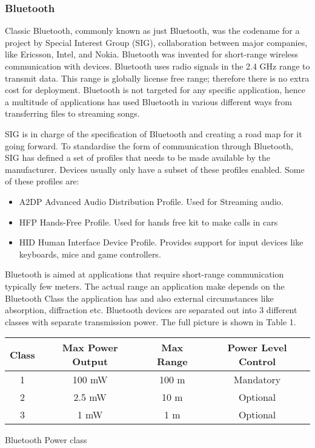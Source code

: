 \subsubsection{Bluetooth}

Classic Bluetooth, commonly known as just Bluetooth, was the codename for
a project by Special Interest Group (SIG), collaboration between major
companies, like Ericsson, Intel, and Nokia\cite{bluetooth-wiki}. Bluetooth was invented
for short-range wireless communication with devices. Bluetooth uses
radio signals in the 2.4 GHz range to transmit data. This range is
globally license free range; therefore there is no extra cost for
deployment. Bluetooth is not targeted for any specific application, hence
a multitude of applications has used Bluetooth in various different
ways from transferring files to streaming songs.

SIG is in charge of the specification of Bluetooth and creating a
road map for it going forward. To standardise the form of communication
through Bluetooth, SIG has defined a set of profiles that needs to
be made available by the manufacturer. Devices usually only have a
subset of these profiles enabled\cite{bluetooth-profiles}. Some of these profiles are: 
\begin{itemize}
\item A2DP Advanced Audio Distribution Profile. Used for Streaming audio. 
\item HFP Hands-Free Profile. Used for hands free kit to make calls in cars 
\item HID Human Interface Device Profile. Provides support for input devices
like keyboards, mice and game controllers.
\end{itemize}
Bluetooth is aimed at applications that require short-range communication
typically few meters. The actual range an application make depends
on the Bluetooth Class the application has and also external circumstances
like absorption, diffraction etc. Bluetooth devices are separated
out into 3 different classes with separate transmission power\cite{bluetooth-chalmers}. The
full picture is shown in Table 1.

\begin{tabular}{|c|c|c|c|}
\hline 
Class & Max Power Output & Max Range & Power Level Control\tabularnewline
\hline 
\hline 
1 & 100 mW & 100 m  & Mandatory\tabularnewline
\hline 
2 & 2.5 mW & 10 m & Optional\tabularnewline
\hline 
3 & 1 mW & 1 m & Optional\tabularnewline
\hline 
\end{tabular}
\begin{table}[H]
\protect\caption{Bluetooth Power class}
\end{table}


